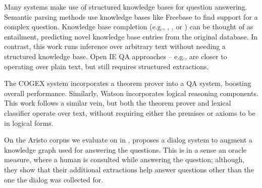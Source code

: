Many systems make use of structured knowledge bases for question
  answering.
Semantic parsing methods 
  \cite{key:2005zettlemoyer-semantics,key:2011liang-semantics}
  use knowledge bases like Freebase to find support for a
  complex question.
Knowledge base completion 
  (e.g., , ,
  or ) can be thought of as entailment,
  predicting novel knowledge base entries from the original database.
In contrast, this work runs inference over arbitrary text without
  needing a structured knowledge base.
Open IE \cite{key:2010wu-openie,key:2012mausam-ollie}
  QA approaches -- e.g., 
  are closer to operating over plain text, but
  still requires structured extractions.

The COGEX system \cite{key:2003moldovan-trec} incorporates a theorem
  prover into a QA system, boosting overall performance.
Similarly, Watson \cite{key:2010ferrucci-watson} incorporates
  logical reasoning components.
This work follows a similar vein, but both the theorem prover
  and lexical classifier operate over text, without requiring either
  the premises or axioms to be in logical forms.
  

On the Aristo corpus we evaluate on in , 
   proposes
  a dialog system to augment a knowledge graph used for answering the questions.
This is in a sense an oracle measure, where a human is consulted while answering
  the question; although, they show that their additional extractions help
  answer questions other than the one the dialog was collected for.














